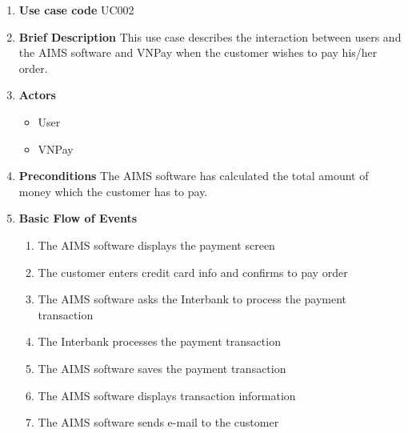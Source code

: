 \documentclass[../UseCaseSpecification.tex]{subfiles}
\begin{document}
\begin{enumerate}
    \item \textbf{Use case code}
    \newline
    UC002

    \item \textbf{Brief Description}
    \newline
    This use case describes the interaction between users and the AIMS software and VNPay when the customer wishes to pay his/her order.

    \item \textbf{Actors}
    \begin{itemize}
        \item User
        \item VNPay
    \end{itemize}

    \item \textbf{Preconditions}
    \newline
    The AIMS software has calculated the total amount of money which the customer has to pay.

    \item \textbf{Basic Flow of Events}
    \begin{enumerate}
        \item The AIMS software displays the payment screen
        \item The customer enters credit card info and confirms to pay order
        \item The AIMS software asks the Interbank to process the payment transaction
        \item The Interbank processes the payment transaction
        \item The AIMS software saves the payment transaction
        \item The AIMS software displays transaction information
        \item The AIMS software sends e-mail to the customer
    \end{enumerate}


\end{enumerate}
\end{document}
